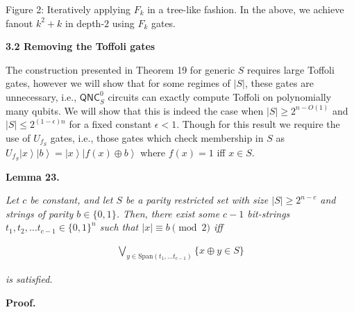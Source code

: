 Figure 2: Iteratively applying $F_{k}$ in a tree-like fashion. In the above, we achieve fanout $k^{2}+k$ in depth-$2$ using $F_{k}$ gates.





\par\medskip\noindent\textbf{
3.2 Removing the Toffoli gates}\par




The construction presented in Theorem 19 for generic $S$ requires large Toffoli gates, however we will show that for some regimes of $|S|$, these gates are unnecessary, i.e., ${\mathsf{QNC}}^{0}_{S}$ circuits can exactly compute Toffoli on polynomially many qubits. We will show that this is indeed the case when $|S|\geq 2^{n-O(1)}$ and $|S|\leq 2^{(1-\epsilon)n}$ for a fixed constant $\epsilon<1$. Though for this result we require the use of $U_{f_{S}}$ gates, i.e., those gates which check membership in $S$ as $U_{f_{S}}\left|x\right\rangle\left|b\right\rangle=\left|x\right\rangle\left|f(x)\oplus b\right\rangle$ where $f(x)=1$ iff $x\in S$.\par





\par\medskip\noindent\textbf{
\textbf{Lemma 23}\textbf{.}
}\par



\emph{Let $c$ be constant, and let $S$ be a parity restricted set with size $|S|\geq 2^{n-c}$ and strings of parity $b\in\{0,1\}$. Then, there exist some $c-1$ bit-strings $t_{1},t_{2},\dots t_{c-1}\in\{0,1\}^{n}$ such that $|x|\equiv b\pmod{2}$ iff}\par


\[\begin{gathered}
\displaystyle\bigvee_{y\in\mathrm{Span}(t_{1},\dots t_{c-1})}\{x\oplus y\in S\}
\end{gathered}\]


\emph{is satisfied.}\par






\par\medskip\noindent\textbf{Proof.}\par




